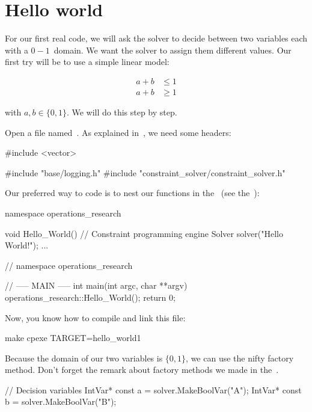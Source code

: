 \documentclass[]{article}
\begin{document}
\section{Hello world}
\label{hello_world}
For our first real code, we will ask the solver to decide between two variables each with a $0-1$~domain. We want the solver to assign them different values. Our first try will be to use a simple linear model:

\begin{align*}
 a + b & \leqslant 1 \\
 a + b & \geqslant 1
\end{align*}

with $a, b \in \{0,1\}$. We will do this step by step.

\begin{exercise}
Open a file named~. As explained in~, we need some headers:

\begin{cppcode}
#include <vector>

#include "base/logging.h"
#include "constraint_solver/constraint_solver.h"
\end{cppcode}

Our preferred way to code is to nest our functions in the~ (see the~):


\begin{cppcode}
namespace operations_research {

void Hello_World() {
  // Constraint programming engine
  Solver solver("Hello World!");
  ...
}
}   // namespace operations_research

// ----- MAIN -----
int main(int argc, char **argv) {
  operations_research::Hello_World();
  return 0;
}
\end{cppcode}

Now, you know how to compile and link this file:

\begin{bashcode}
make cpexe TARGET=hello_world1
\end{bashcode}

Because the domain of our two variables is $\{0,1\}$, we can use the nifty
 factory method. Don't forget the remark about
factory methods we made in the~.

\begin{cppcode}
  // Decision variables
  IntVar* const a = solver.MakeBoolVar("A");
  IntVar* const b = solver.MakeBoolVar("B");


\end{cppcode}
\end{exercise}
\end{document}
